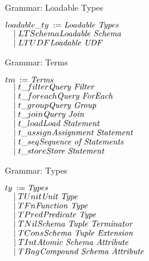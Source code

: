 \begin{frame}{Grammar: Loadable Types}
\centering
	\begin{flushleft}
	$ loadable\_ty \::= \hfill \textnormal{\emph{Loadable Types}}\hfill$\\
	$ \quad \mid LTSchema\hfill \textnormal{\emph{Loadable Schema}}\hfill$\\
   	$ \quad \mid LTUDF \hfill \textnormal{\emph{Loadable UDF}}\hfill$\\
	\end{flushleft}
\end{frame}

\begin{frame}{Grammar: Terms}
\centering
	\begin{flushleft}
	$ tm \::= \hfill \textnormal{\emph{Terms}}\hfill$\\
	$ \quad \mid t\_filter\hfill \textnormal{\emph{Query Filter}}\hfill$\\
   	$ \quad \mid t\_foreach \hfill \textnormal{\emph{Query ForEach}}\hfill$\\
     	$ \quad \mid t\_group \hfill \textnormal{\emph{Query Group}}\hfill$\\
     	$ \quad \mid t\_join \hfill \textnormal{\emph{Query Join}}\hfill$\\
     	$ \quad \mid t\_load \hfill \textnormal{\emph{Load Statement}}\hfill$\\
   	$ \quad \mid t\_assign \hfill \textnormal{\emph{Assignment Statement}}\hfill$\\
     	$ \quad \mid t\_seq \hfill \textnormal{\emph{Sequence of Statements}}\hfill$\\
     	$ \quad \mid t\_store \hfill \textnormal{\emph{Store Statement}}\hfill$\\
	\end{flushleft}
\end{frame}

\begin{frame}{Grammar: Types}
\centering
	\begin{flushleft}
	$ ty \::= \hfill \textnormal{\emph{Types}}\hfill$\\
	$ \quad \mid TUnit\hfill \textnormal{\emph{Unit Type}}\hfill$\\
   	$ \quad \mid TFn \hfill \textnormal{\emph{Function Type}}\hfill$\\
     	$ \quad \mid TPred \hfill \textnormal{\emph{Predicate Type}}\hfill$\\
     	$ \quad \mid TNil \hfill \textnormal{\emph{Schema Tuple Terminator}}\hfill$\\
     	$ \quad \mid TCons \hfill \textnormal{\emph{Schema Tuple Extension}}\hfill$\\
   	$ \quad \mid TInt \hfill \textnormal{\emph{Atomic Schema Attribute}}\hfill$\\
     	$ \quad \mid TBag \hfill \textnormal{\emph{Compound Schema Attribute}}\hfill$\\
	\end{flushleft}
\end{frame}

